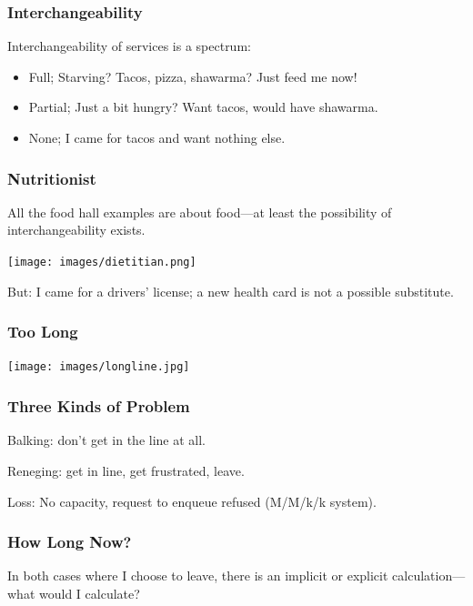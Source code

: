 \begin{frame}
\frametitle{Interchangeability}

Interchangeability of services is a spectrum:

\begin{itemize}
	\item Full; Starving? Tacos, pizza, shawarma? Just feed me now! \vspace{5em}
	\item Partial; Just a bit hungry? Want tacos, would have shawarma. \vspace{5em}
	\item None; I came for tacos and want nothing else.
\end{itemize}


\end{frame}


\begin{frame}
\frametitle{Nutritionist}

All the food hall examples are about food---at least the possibility of interchangeability exists.

\begin{center}
	\texttt{[image: images/dietitian.png]}
\end{center}

But: I came for a drivers' license; a new health card is not a possible substitute.

\end{frame}


\begin{frame}
\frametitle{Too Long}

\begin{center}
	\texttt{[image: images/longline.jpg]}
\end{center}


\end{frame}



\begin{frame}
\frametitle{Three Kinds of Problem}

Balking: don't get in the line at all.


Reneging: get in line, get frustrated, leave.


Loss: No capacity, request to enqueue refused (M/M/k/k system).


\end{frame}


\begin{frame}
\frametitle{How Long Now?}

In both cases where I choose to leave, there is an implicit or explicit calculation---what would I calculate?


\end{frame}


